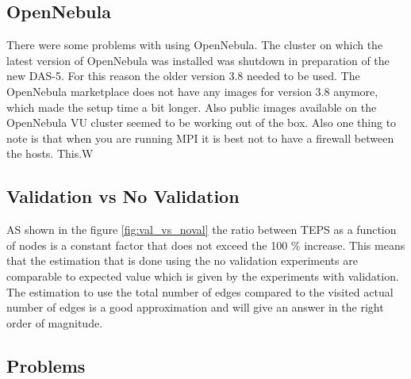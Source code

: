 \subsection{OpenNebula}
There were some problems with using OpenNebula. The cluster on which the latest version of OpenNebula was installed was shutdown in preparation of the new DAS-5. For this reason the older version 3.8 needed to be used. The OpenNebula marketplace does not have any images for version 3.8 anymore, which made the setup time a bit longer. Also public images available on the OpenNebula VU cluster seemed to be working out of the box. Also one thing to note is that when you are running MPI it is best not to have a firewall between the hosts. This.W

\subsection{Validation vs No Validation}
AS shown in the figure \ref{fig:val_vs_noval} the ratio between TEPS as a function of nodes is a constant factor that does not exceed the 100 \% increase. This means that the estimation that is done using the no validation experiments are comparable to expected value which is given by the experiments with validation. The estimation to use the total number of edges compared to the visited actual number of edges is a good approximation and will give an answer in the right order of magnitude. 

\subsection{Problems}
